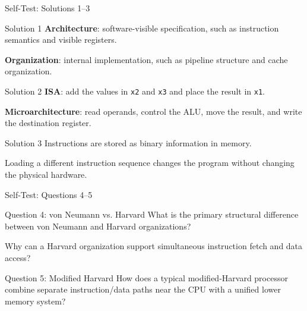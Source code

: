 \documentclass[aspectratio=169,11pt,t]{beamer}
\newcommand{\key}[1]{\textbf{#1}}
\newcommand{\code}[1]{\texttt{#1}}
\begin{document}

\begin{frame}{Self-Test: Solutions 1--3}

\vspace{-0.08cm}

\begin{block}{Solution 1}
\key{Architecture}:
software-visible specification,
such as instruction semantics
and visible registers.

\key{Organization}:
internal implementation,
such as pipeline structure
and cache organization.
\end{block}

\begin{block}{Solution 2}
\key{ISA}:
add the values in
\code{x2} and \code{x3}
and place the result
in \code{x1}.

\key{Microarchitecture}:
read operands,
control the ALU,
move the result,
and write the destination register.
\end{block}

\begin{block}{Solution 3}
Instructions are stored
as binary information in memory.

Loading a different instruction sequence
changes the program
without changing the physical hardware.
\end{block}

\end{frame}




\begin{frame}{Self-Test: Questions 4--5}

\begin{block}{Question 4: von Neumann vs. Harvard}
What is the primary structural difference
between von Neumann
and Harvard organizations?

Why can a Harvard organization support
simultaneous instruction fetch
and data access?
\end{block}

\vspace{0.35cm}

\begin{block}{Question 5: Modified Harvard}
How does a typical modified-Harvard processor
combine separate instruction/data paths
near the CPU
with a unified lower memory system?
\end{block}

\end{frame}
\end{document}
